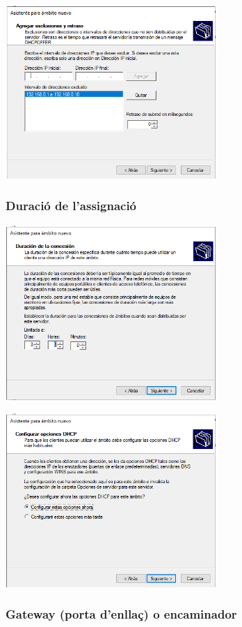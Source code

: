 \documentclass[
  a4paper,
]{article}
\begin{document}
\includegraphics[width=0.6\textwidth,height=\textheight]{png/DHCP9.png}

\subsubsection{Duració de
l'assignació}\label{duraciuxf3-de-lassignaciuxf3}

\includegraphics[width=0.6\textwidth,height=\textheight]{png/DHCP10.png}

\includegraphics[width=0.6\textwidth,height=\textheight]{png/DHCP11.png}

\subsubsection{Gateway (porta d'enllaç) o
encaminador}\label{gateway-porta-denllauxe7-o-encaminador}
\end{document}
